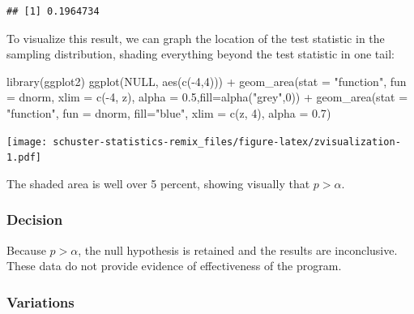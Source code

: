 \documentclass[
]{book}
\newenvironment{Shaded}{\begin{snugshade}}{\end{snugshade}}
\newcommand{\AttributeTok}[1]{\textcolor[rgb]{0.77,0.63,0.00}{#1}}
\newcommand{\ConstantTok}[1]{\textcolor[rgb]{0.00,0.00,0.00}{#1}}
\newcommand{\DecValTok}[1]{\textcolor[rgb]{0.00,0.00,0.81}{#1}}
\newcommand{\FloatTok}[1]{\textcolor[rgb]{0.00,0.00,0.81}{#1}}
\newcommand{\FunctionTok}[1]{\textcolor[rgb]{0.00,0.00,0.00}{#1}}
\newcommand{\NormalTok}[1]{#1}
\newcommand{\SpecialCharTok}[1]{\textcolor[rgb]{0.00,0.00,0.00}{#1}}
\newcommand{\StringTok}[1]{\textcolor[rgb]{0.31,0.60,0.02}{#1}}
\begin{document}
\begin{verbatim}
## [1] 0.1964734
\end{verbatim}

To visualize this result, we can graph the location of the test statistic in the sampling distribution, shading everything beyond the test statistic in one tail:

\begin{Shaded}
\begin{Highlighting}[]
\FunctionTok{library}\NormalTok{(ggplot2)}
\FunctionTok{ggplot}\NormalTok{(}\ConstantTok{NULL}\NormalTok{, }\FunctionTok{aes}\NormalTok{(}\FunctionTok{c}\NormalTok{(}\SpecialCharTok{{-}}\DecValTok{4}\NormalTok{,}\DecValTok{4}\NormalTok{))) }\SpecialCharTok{+}
  \FunctionTok{geom\_area}\NormalTok{(}\AttributeTok{stat =} \StringTok{"function"}\NormalTok{, }\AttributeTok{fun =}\NormalTok{ dnorm, }\AttributeTok{xlim =} \FunctionTok{c}\NormalTok{(}\SpecialCharTok{{-}}\DecValTok{4}\NormalTok{, z), }\AttributeTok{alpha =} \FloatTok{0.5}\NormalTok{,}\AttributeTok{fill=}\FunctionTok{alpha}\NormalTok{(}\StringTok{"grey"}\NormalTok{,}\DecValTok{0}\NormalTok{)) }\SpecialCharTok{+}
  \FunctionTok{geom\_area}\NormalTok{(}\AttributeTok{stat =} \StringTok{"function"}\NormalTok{, }\AttributeTok{fun =}\NormalTok{ dnorm, }\AttributeTok{fill=}\StringTok{"blue"}\NormalTok{, }\AttributeTok{xlim =} \FunctionTok{c}\NormalTok{(z, }\DecValTok{4}\NormalTok{), }\AttributeTok{alpha =} \FloatTok{0.7}\NormalTok{)}
\end{Highlighting}
\end{Shaded}

\texttt{[image: schuster-statistics-remix\_files/figure-latex/zvisualization-1.pdf]}

The shaded area is well over 5 percent, showing visually that \(p>\alpha\).

\hypertarget{decision}{%
\subsubsection{Decision}\label{decision}}

Because \(p>{\alpha}\), the null hypothesis is retained and the results are inconclusive. These data do not provide evidence of effectiveness of the program.

\hypertarget{variations}{%
\subsubsection{Variations}\label{variations}}
\end{document}
